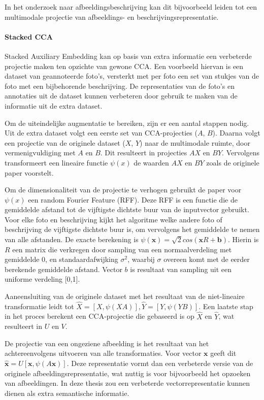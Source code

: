 In het onderzoek naar afbeeldingsbeschrijving kan dit bijvoorbeeld leiden tot een multimodale projectie van afbeeldings- en beschrijvingsrepresentatie.

\paragraph{Stacked CCA}

Stacked Auxiliary Embedding\cite{Gong2014} kan op basis van extra informatie een verbeterde projectie maken ten opzichte van gewone CCA. Een voorbeeld hiervan is een dataset van geannoteerde foto's, versterkt met per foto een set van stukjes van de foto met een bijbehorende beschrijving. De representaties van de foto's en annotaties uit de dataset kunnen verbeteren door gebruik te maken van de informatie uit de extra dataset.

Om de uiteindelijke augmentatie te bereiken, zijn er een aantal stappen nodig. Uit de extra dataset volgt een eerste set van CCA-projecties ($A$, $B$). Daarna volgt een projectie van de originele dataset ($X$, $Y$) naar de multimodale ruimte, door vermenigvuldiging met $A$ en $B$. Dit resulteert in projecties $AX$ en $BY$. Vervolgens transformeert een lineaire functie $\psi(x)$ de waarden $AX$ en $BY$ zoals de originele paper voorstelt.

Om de dimensionaliteit van de projectie te verhogen gebruikt de paper voor $\psi(x)$ een random Fourier Feature (RFF). Deze RFF is een functie die de gemiddelde afstand tot de vijftigste dichtste buur van de inputvector gebruikt. Voor elke foto en beschrijving kijkt het algoritme welke andere foto of beschrijving de vijftigste dichtste buur is, om vervolgens het gemiddelde te nemen van alle afstanden. De exacte berekening is $\psi(\mathbf{x})=\sqrt{2}cos(\mathbf{x}R+\mathbf{b})$. Hierin is $R$ een matrix die verkregen door sampling van een normaalverdeling met gemiddelde 0, en standaardafwijking $\sigma^2$, waarbij $\sigma$ overeen komt met de eerder berekende gemiddelde afstand. Vector $b$ is resultaat van sampling uit een uniforme verdeling [0,1].

Aaneensluiting van de originele dataset met het resultaat van de niet-lineaire transformatie leidt tot $\hat{X} = [X, \psi(XA)], \hat{Y} = [Y, \psi(YB)]$. Een laatste stap in het proces berekent een CCA-projectie die gebaseerd is op $\hat{X}$ en $\hat{Y}$, wat resulteert in $U$ en $V$.

De projectie van een ongeziene afbeelding is het resultaat van het achtereenvolgens uitvoeren van alle transformaties. Voor vector $\mathbf{x}$ geeft dit $\mathbf{\hat{x}} = U[\mathbf{x}, \psi(A\mathbf{x})]$. Deze representatie vormt dan een verbeterde versie van de originele afbeeldingsrepresentatie, wat nuttig is voor bijvoorbeeld het opzoeken van afbeeldingen. In deze thesis zou een verbeterde vectorrepresentatie kunnen dienen als extra semantische informatie. 
